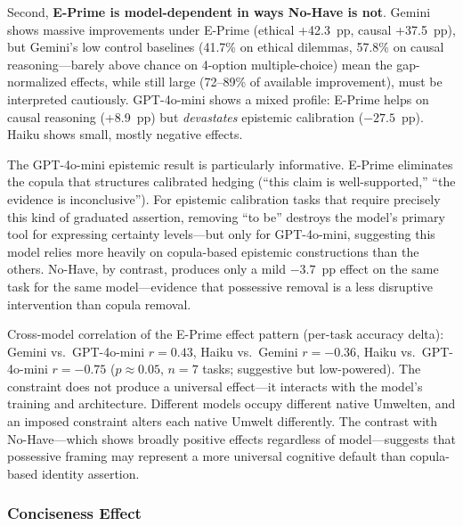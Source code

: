 \documentclass[11pt,a4paper]{article}
\begin{document}
Second, \textbf{E-Prime is model-dependent in ways No-Have is not}. Gemini shows massive improvements under E-Prime (ethical +42.3~pp, causal +37.5~pp), but Gemini's low control baselines (41.7\% on ethical dilemmas, 57.8\% on causal reasoning---barely above chance on 4-option multiple-choice) mean the gap-normalized effects, while still large (72--89\% of available improvement), must be interpreted cautiously. GPT-4o-mini shows a mixed profile: E-Prime helps on causal reasoning (+8.9~pp) but \emph{devastates} epistemic calibration ($-27.5$~pp). Haiku shows small, mostly negative effects.

The GPT-4o-mini epistemic result is particularly informative. E-Prime eliminates the copula that structures calibrated hedging (``this claim is well-supported,'' ``the evidence is inconclusive''). For epistemic calibration tasks that require precisely this kind of graduated assertion, removing ``to be'' destroys the model's primary tool for expressing certainty levels---but only for GPT-4o-mini, suggesting this model relies more heavily on copula-based epistemic constructions than the others. No-Have, by contrast, produces only a mild $-3.7$~pp effect on the same task for the same model---evidence that possessive removal is a less disruptive intervention than copula removal.

Cross-model correlation of the E-Prime effect pattern (per-task accuracy delta): Gemini vs.\ GPT-4o-mini $r = 0.43$, Haiku vs.\ Gemini $r = -0.36$, Haiku vs.\ GPT-4o-mini $r = -0.75$ ($p \approx 0.05$, $n = 7$ tasks; suggestive but low-powered). The constraint does not produce a universal effect---it interacts with the model's training and architecture. Different models occupy different native Umwelten, and an imposed constraint alters each native Umwelt differently. The contrast with No-Have---which shows broadly positive effects regardless of model---suggests that possessive framing may represent a more universal cognitive default than copula-based identity assertion.

\subsubsection{Conciseness Effect}
\end{document}
